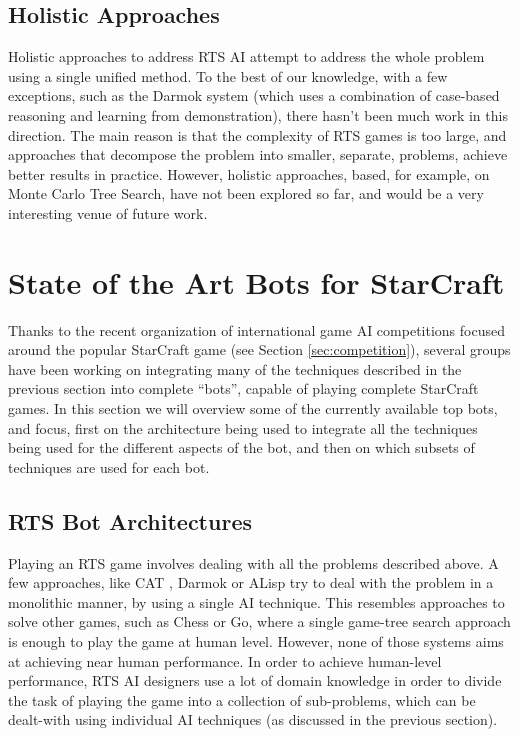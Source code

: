\documentclass[journal]{IEEEtran}
\begin{document}
\subsection{Holistic Approaches}

Holistic approaches to address RTS AI attempt to address the whole problem using a single unified method. To the best of our knowledge, with a few exceptions, such as the Darmok system \cite{OntanonMSR10} (which uses a combination of case-based reasoning and learning from demonstration), there hasn't been much work in this direction.   The main reason is that the complexity of RTS games is too large, and approaches that decompose the problem into smaller, separate, problems, achieve better results in practice. However, holistic approaches, based, for example, on Monte Carlo Tree Search, have not been explored so far, and would be a very interesting venue of future work.

\section{State of the Art Bots for StarCraft}\label{sec:bot}

Thanks to the recent organization of international game AI competitions focused around the popular StarCraft game (see Section \ref{sec:competition}), several groups have been working on integrating many of the techniques described in the previous section into complete ``bots'', capable of playing complete StarCraft games. In this section we will overview some of the currently available top bots, and focus, first on the architecture being used to integrate all the techniques being used for the different aspects of the bot, and then on which subsets of techniques are used for each bot.

\subsection{RTS Bot Architectures}\label{sec:integration}

Playing an RTS game involves dealing with all the problems described above. A few approaches, like CAT \cite{LTW}, Darmok \cite{OntanonMSR10} or ALisp \cite{Marthi05} try to deal with the problem in a monolithic manner, by using a single AI technique. This resembles approaches to solve other games, such as Chess or Go, where a single game-tree search approach is enough to play the game at human level. However, none of those systems aims at achieving near human performance. In order to achieve human-level performance, RTS AI designers use a lot of domain knowledge in order to divide the task of playing the game into a collection of sub-problems, which can be dealt-with using individual AI techniques (as discussed in the previous section). 
\end{document}
